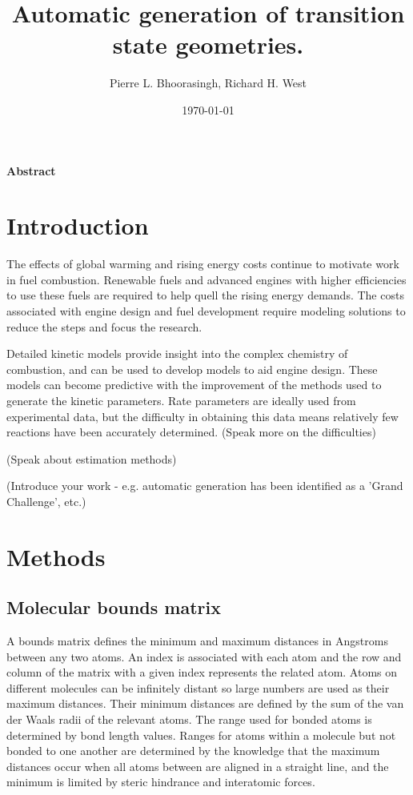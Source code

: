 \documentclass[11pt]{article}
\begin{document}
\title{Automatic generation of transition state geometries.}
\author{Pierre L. Bhoorasingh, Richard H. West}
\date{\today}
\maketitle

\newpage
\paragraph{Abstract}

\newpage
\section{Introduction}
The effects of global warming and rising energy costs continue to motivate work in fuel combustion. Renewable fuels and advanced engines with higher efficiencies to use these fuels are required to help quell the rising energy demands. The costs associated with engine design and fuel development require modeling solutions to reduce the steps and focus the research.

Detailed kinetic models provide insight into the complex chemistry of combustion, and can be used to develop models to aid engine design. These models can become predictive with the improvement of the methods used to generate the kinetic parameters. Rate parameters are ideally used from experimental data, but the difficulty in obtaining this data means relatively few reactions have been accurately determined. (Speak more on the difficulties)

(Speak about estimation methods)

(Introduce your work - e.g. automatic generation has been identified as a 'Grand Challenge', etc.)

\section{Methods}
\subsection{Molecular bounds matrix}
A bounds matrix defines the minimum and maximum distances in Angstroms between any two atoms. An index is associated with each atom and the row and column of the matrix with a given index represents the related atom. Atoms on different molecules can be infinitely distant so large numbers are used as their maximum distances. Their minimum distances are defined by the sum of the van der Waals radii of the relevant atoms. The range used for bonded atoms is determined by bond length values. Ranges for atoms within a molecule but not bonded to one another are determined by the knowledge that the maximum distances occur when all atoms between are aligned in a straight line, and the minimum is limited by steric hindrance and interatomic forces.
\end{document}
